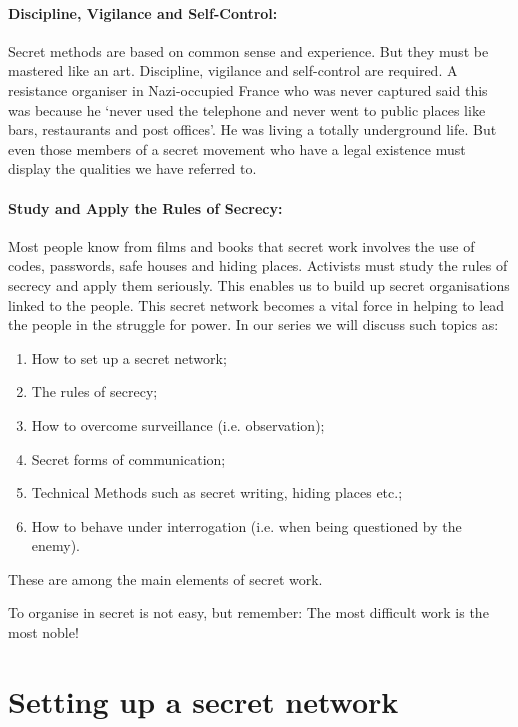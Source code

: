 \paragraph{Discipline, Vigilance and Self-Control:}

Secret methods are based on common sense and experience. But they must
be mastered like an art. Discipline, vigilance and self-control are
required. A resistance organiser in Nazi-occupied France who was never
captured said this was because he `never used the telephone and never
went to public places like bars, restaurants and post offices'. He was
living a totally underground life. But even those members of a secret
movement who have a legal existence must display the qualities we have
referred to.

\paragraph{Study and Apply the Rules of Secrecy:}

Most people know from films and books that secret work involves the use
of codes, passwords, safe houses and hiding places. Activists must study
the rules of secrecy and apply them seriously. This enables us to build
up secret organisations linked to the people. This secret network
becomes a vital force in helping to lead the people in the struggle for
power. In our series we will discuss such topics as:

\begin{enumerate}
\tightlist
\item
  How to set up a secret network;
\item
  The rules of secrecy;
\item
  How to overcome surveillance (i.e. observation);
\item
  Secret forms of communication;
\item
  Technical Methods such as secret writing, hiding places etc.;
\item
  How to behave under interrogation (i.e. when being questioned by the
  enemy).
\end{enumerate}

These are among the main elements of secret work.

To organise in secret is not easy, but remember: The most difficult work
is the most noble!

\section{Setting up a secret network}

